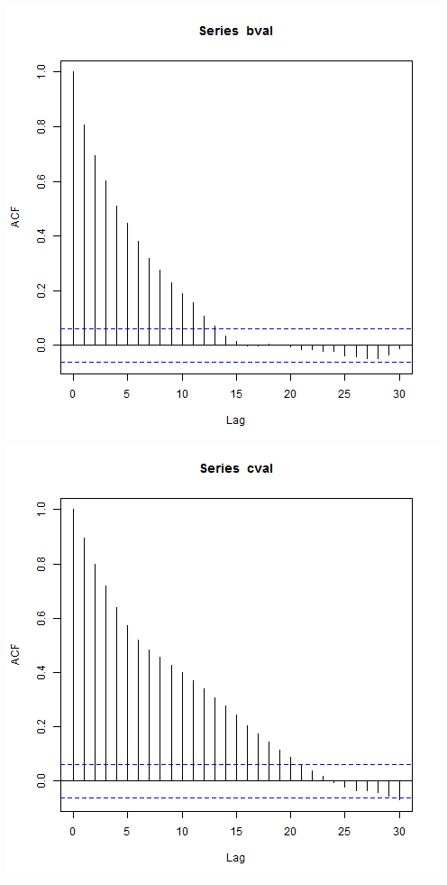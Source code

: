 \documentclass{article}
\begin{document}
\begin{enumerate}
\begin{enumerate}
\includegraphics[scale=0.4]{bacf.png}
\includegraphics[scale=0.4]{acfc.png} \\


\end{enumerate}
\end{enumerate}
\end{document}

